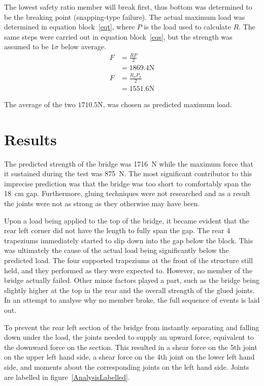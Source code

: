 \documentclass[12pt]{article}
\begin{document}
		The lowest safety ratio member will break first, thus bottom was determined to be the breaking point (snapping-type failure). The actual maximum load was determined in equation block~\ref{eqt}, where $P$ is the load used to calculate $R$. The same steps were carried out in equation block~\ref{eqs}, but the strength was assumed to be $1\sigma$ below average.
		\begin{subequations}
			\begin{align}
				F&=\frac{R P}{2} \\
				&=1869.4 \mathrm{N}
			\end{align}
			\label{eqt}
		\end{subequations}
		\begin{subequations}
			\begin{align}
				F&=\frac{R_{\sigma} P_{\sigma}}{2} \\
				&=1551.6 \mathrm{N}
			\end{align}
			\label{eqs}
		\end{subequations}

		The average of the two $1710.5\mathrm{N}$, was chosen as predicted maximum load.
	\section{Results}
The predicted strength of the bridge was 1716~N while the maximum force that it sustained during the test was 875~N. The most significant contributor to this imprecise prediction was that the bridge was too short to comfortably span the 18~cm gap. Furthermore, gluing techniques were not researched and as a result the joints were not as strong as they otherwise may have been.

Upon a load being applied to the top of the bridge, it became evident that the rear left corner did not have the length to fully span the gap. The rear 4 trapeziums immediately started to slip down into the gap below the block. This was ultimately the cause of the actual load being significantly below the predicted load. The four supported trapeziums at the front of the structure still held, and they performed as they were expected to. However, no member of the bridge actually failed. Other minor factors played a part, such as the bridge being slightly higher at the top in the rear and the overall strength of the glued joints. In an attempt to analyse why no member broke, the full sequence of events is laid out.

To prevent the rear left section of the bridge from instantly separating and falling down under the load, the joints needed to supply an upward force, equivalent to the downward force on the section. This resulted in a shear force on the 5th joint on the upper left hand side, a shear force on the 4th joint on the lower left hand side, and moments about the corresponding joints on the left hand side. Joints are labelled in figure~\ref{AnalysisLabelled}.
\end{document}
